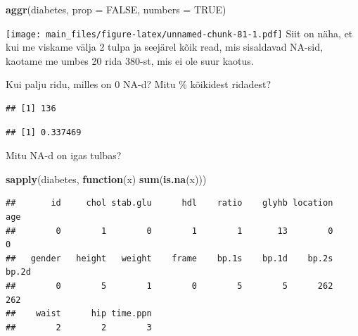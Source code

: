 \documentclass[]{book}
\newenvironment{Shaded}{\begin{snugshade}}{\end{snugshade}}
\newcommand{\KeywordTok}[1]{\textcolor[rgb]{0.13,0.29,0.53}{\textbf{#1}}}
\newcommand{\DataTypeTok}[1]{\textcolor[rgb]{0.13,0.29,0.53}{#1}}
\newcommand{\StringTok}[1]{\textcolor[rgb]{0.31,0.60,0.02}{#1}}
\newcommand{\CommentTok}[1]{\textcolor[rgb]{0.56,0.35,0.01}{\textit{#1}}}
\newcommand{\OtherTok}[1]{\textcolor[rgb]{0.56,0.35,0.01}{#1}}
\newcommand{\ControlFlowTok}[1]{\textcolor[rgb]{0.13,0.29,0.53}{\textbf{#1}}}
\newcommand{\OperatorTok}[1]{\textcolor[rgb]{0.81,0.36,0.00}{\textbf{#1}}}
\newcommand{\NormalTok}[1]{#1}
\begin{document}
\begin{Shaded}
\begin{Highlighting}[]
\KeywordTok{aggr}\NormalTok{(diabetes, }\DataTypeTok{prop =} \OtherTok{FALSE}\NormalTok{, }\DataTypeTok{numbers =} \OtherTok{TRUE}\NormalTok{)}
\end{Highlighting}
\end{Shaded}

\texttt{[image: main\_files/figure-latex/unnamed-chunk-81-1.pdf]} Siit on
näha, et kui me viskame välja 2 tulpa ja seejärel kõik read, mis
sisaldavad NA-sid, kaotame me umbes 20 rida 380-st, mis ei ole suur
kaotus.

Kui palju ridu, milles on 0 NA-d? Mitu \% kõikidest ridadest?

\begin{Shaded}
\end{Shaded}

\begin{verbatim}
## [1] 136
\end{verbatim}

\begin{Shaded}
\end{Shaded}

\begin{verbatim}
## [1] 0.337469
\end{verbatim}

Mitu NA-d on igas tulbas?

\begin{Shaded}
\begin{Highlighting}[]
\KeywordTok{sapply}\NormalTok{(diabetes, }\ControlFlowTok{function}\NormalTok{(x) }\KeywordTok{sum}\NormalTok{(}\KeywordTok{is.na}\NormalTok{(x))) }
\end{Highlighting}
\end{Shaded}

\begin{verbatim}
##       id     chol stab.glu      hdl    ratio    glyhb location      age 
##        0        1        0        1        1       13        0        0 
##   gender   height   weight    frame    bp.1s    bp.1d    bp.2s    bp.2d 
##        0        5        1        0        5        5      262      262 
##    waist      hip time.ppn 
##        2        2        3
\end{verbatim}
\end{document}
